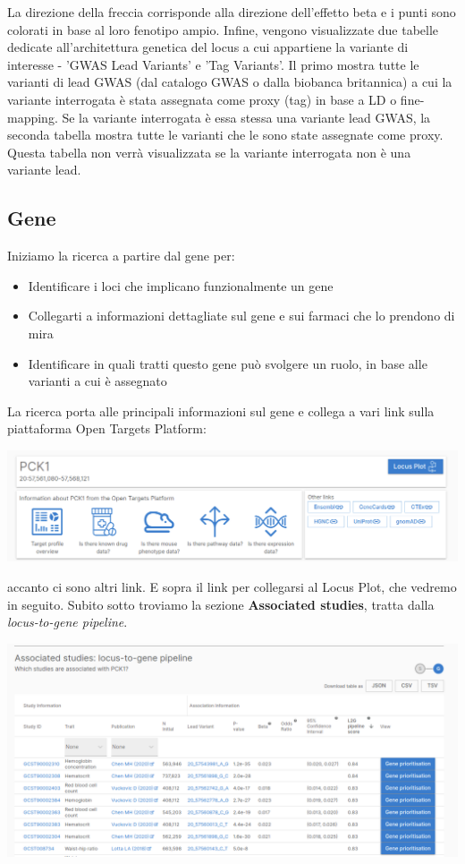 \documentclass{article}
\begin{document}
La direzione della freccia corrisponde alla direzione dell'effetto beta e i punti sono colorati in base al loro fenotipo ampio.
Infine, vengono visualizzate due tabelle dedicate all'architettura genetica del locus a cui appartiene la variante di interesse - 'GWAS Lead Variants' e 'Tag Variants'. Il primo mostra tutte le varianti di lead GWAS (dal catalogo GWAS o dalla biobanca britannica) a cui la variante interrogata è stata assegnata come proxy (tag) in base a LD o fine-mapping. Se la variante interrogata è essa stessa una variante lead GWAS, la seconda tabella mostra tutte le varianti che le sono state assegnate come proxy. Questa tabella non verrà visualizzata se la variante interrogata non è una variante lead.
\subsection{Gene}
\begin{box4}
    [title={\textbf{Ricerca per Gene}}]
    {Iniziamo la ricerca a partire dal gene per:
    \begin{itemize}
        \item Identificare i loci che implicano funzionalmente un gene
        \item Collegarti a informazioni dettagliate sul gene e sui farmaci che lo prendono di mira
        \item Identificare in quali tratti questo gene può svolgere un ruolo, in base alle varianti a cui è assegnato
    \end{itemize}}
\end{box4}
La ricerca porta alle principali informazioni sul gene e collega a vari link sulla piattaforma Open Targets Platform:
\begin{center}
    \includegraphics[width=1\textwidth]{figures/1-Gene.png}
\end{center}
accanto ci sono altri link. E sopra il link per collegarsi al Locus Plot, che vedremo in seguito.
Subito sotto troviamo la sezione \textbf{Associated studies}, tratta dalla \textit{locus-to-gene pipeline}.
\begin{center}
    \includegraphics[width=1\textwidth]{figures/2-Gene.png}
\end{center}
\end{document}
